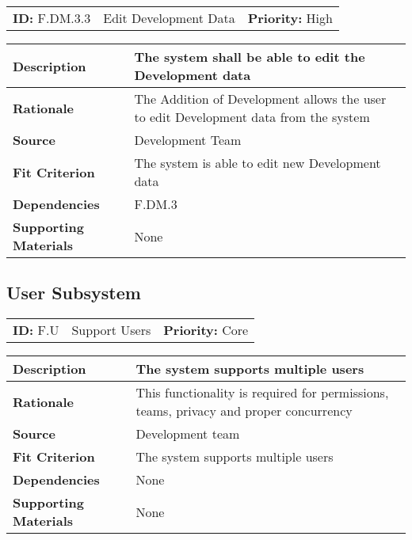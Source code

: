 \begin{table}[H]
    \begin{tabularx}{\textwidth}{| l | X | l |}
        \hline
        \textbf{ID:} F.DM.3.3 & Edit Development Data & \textbf{Priority:} High \\
    \end{tabularx}
    \begin{tabularx}{\textwidth}{| l | X |}
        \hline
        \textbf{Description} & The system shall be able to edit the Development data \\ \hline
        \textbf{Rationale} & The Addition of Development allows the user to edit Development data from the system\\ \hline
        \textbf{Source} & Development Team\\ \hline
        \textbf{Fit Criterion} & The system is able to edit new Development data\\ \hline
        \textbf{Dependencies} & F.DM.3 \\ \hline
        \textbf{Supporting Materials} & None \\ \hline
    \end{tabularx}
\end{table}

\subsection{User Subsystem}

\begin{table}[H]
    \begin{tabularx}{\textwidth}{| l | X | l |}
        \hline
        \textbf{ID:} F.U & Support Users & \textbf{Priority:} Core \\
    \end{tabularx}
    \begin{tabularx}{\textwidth}{| l | X |}
        \hline
        \textbf{Description} & The system supports multiple users\\ \hline
        \textbf{Rationale} & This functionality is required for permissions, teams, privacy and proper concurrency \\ \hline
        \textbf{Source} &  Development team\\ \hline
        \textbf{Fit Criterion} & The system supports multiple users \\ \hline
        \textbf{Dependencies} & None \\ \hline
        \textbf{Supporting Materials} & None \\ \hline
    \end{tabularx}
\end{table}

